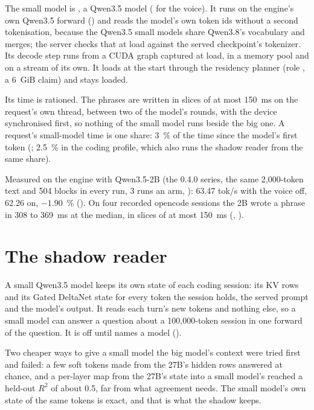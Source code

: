 The small model is , a Qwen3.5 model ( for the voice). It runs on the engine's own Qwen3.5 forward () and reads the model's own token ids without a second tokenisation, because the Qwen3.5 small models share Qwen3.8's vocabulary and merges; the server checks that at load against the served checkpoint's tokenizer. Its decode step runs from a CUDA graph captured at load, in a memory pool and on a stream of its own. It loads at the start through the residency planner (role , a 6~GiB claim) and stays loaded.

Its time is rationed. The phrases are written in slices of at most 150~ms on the request's own thread, between two of the model's rounds, with the device synchronised first, so nothing of the small model runs beside the big one. A request's small-model time is one share: 3~\% of the time since the model's first token (; 2.5~\% in the coding profile, which also runs the shadow reader from the same share).

Measured on the engine with Qwen3.5-2B (the 0.4.0 series, the same 2,000-token text and 504 blocks in every run, 3 runs an arm, ): 63.47 tok/s with the voice off, 62.26 on, $-1.90$~\% (\measured). On four recorded opencode sessions the 2B wrote a phrase in 308 to 369~ms at the median, in slices of at most 150~ms (\measured, ).

\section{The shadow reader}\label{sec:shadow}

A small Qwen3.5 model keeps its own state of each coding session: its KV rows and its Gated DeltaNet state for every token the session holds, the served prompt and the model's output. It reads each turn's new tokens and nothing else, so a small model can answer a question about a 100,000-token session in one forward of the question. It is off until  names a model ().

Two cheaper ways to give a small model the big model's context were tried first and failed: a few soft tokens made from the 27B's hidden rows answered at chance, and a per-layer map from the 27B's state into a small model's reached a held-out $R^2$ of about 0.5, far from what agreement needs. The small model's own state of the same tokens is exact, and that is what the shadow keeps.

